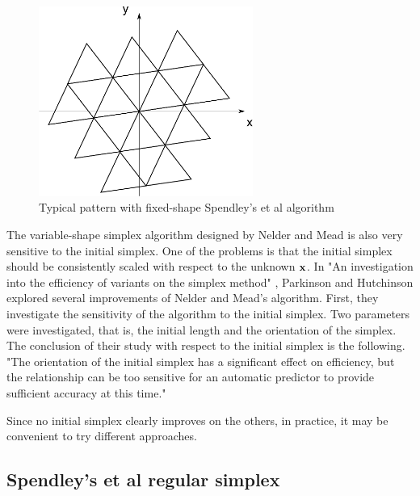 \begin{figure}
\begin{center}
\includegraphics[width=7cm]{simplex_initialfixed.pdf}
\end{center}
\caption{Typical pattern with fixed-shape Spendley's et al algorithm}
\label{fig-nm-simplex-fixedshape}
\end{figure}

The variable-shape simplex algorithm designed by Nelder and Mead is also very
sensitive to the initial simplex.
One of the problems is that the initial simplex should be consistently scaled 
with respect to the unknown $\mathbf{x}$.
In "An investigation into the efficiency of variants on the simplex method" \cite{parkinson1972}, 
Parkinson and Hutchinson explored 
several improvements of Nelder and Mead's algorithm. First, they investigate the sensitivity
of the algorithm to the initial simplex. Two parameters were investigated,
that is, the initial length and the orientation of the simplex. 
The conclusion of their study with respect to the initial simplex is 
the following. "The orientation of the initial simplex has a significant effect 
on efficiency, but the relationship can be too sensitive for an automatic 
predictor to provide sufficient accuracy at this time."

Since no initial simplex clearly improves on the others, in practice, 
it may be convenient to try different approaches.

\subsection{Spendley's et al regular simplex}

